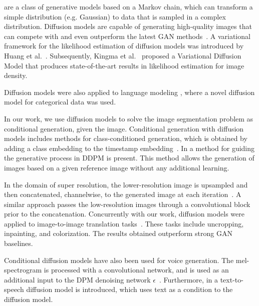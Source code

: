 \documentclass[10pt,twocolumn,letterpaper]{article}
\begin{document}
 are a class of generative models based on a Markov chain, which can transform a simple distribution (e.g. Gaussian) to data that is sampled in a complex distribution. Diffusion models are capable of generating high-quality images that can compete with and even outperform the latest GAN methods~\cite{sohl2015deep,ho2020denoising,nichol2021improved,dhariwal2021diffusion}. A variational framework for the likelihood estimation of diffusion models was introduced by Huang et al.~\cite{huang2021variational}. Subsequently, Kingma et al.~\cite{kingma2021variational} proposed a Variational Diffusion Model that produces state-of-the-art results in likelihood estimation for image density. 

Diffusion models were also applied to language modeling \cite{hoogeboom2021argmax,austin2021structured}, where a novel diffusion model for categorical data was used.

 In our work, we use diffusion models to solve the image segmentation problem as conditional generation, given the image. Conditional generation with diffusion models includes methods for class-conditioned generation, which is obtained by adding a class embedding to the timestamp embedding~\cite{nichol2021improved}. In \cite{choi2021ilvr} a method for guiding the generative process in DDPM is present. This method allows the generation of images based on a given reference image without any additional learning. 

In the domain of super resolution, the lower-resolution image is upsampled and then concatenated, channelwise, to the generated image at each iteration~\cite{saharia2021image,ho2022cascaded}. A similar approach passes the low-resolution images through a convolutional block~\cite{li2022srdiff} prior to the concatenation. Concurrently with our work, diffusion models were applied to image-to-image translation tasks~\cite{saharia2021palette}. These tasks include uncropping, inpainting, and colorization. The results obtained outperform strong GAN baselines.

Conditional diffusion models have also been used for voice generation. The mel-spectrogram is processed with a convolutional network, and is used as an additional input to the DPM denoising network $\epsilon$~\cite{chen2020wavegrad,kong2020diffwave,liu2021diffsinger}. Furthermore, in \cite{popov2021grad} a text-to-speech diffusion model is introduced, which uses text as a condition to the diffusion model.
\end{document}
